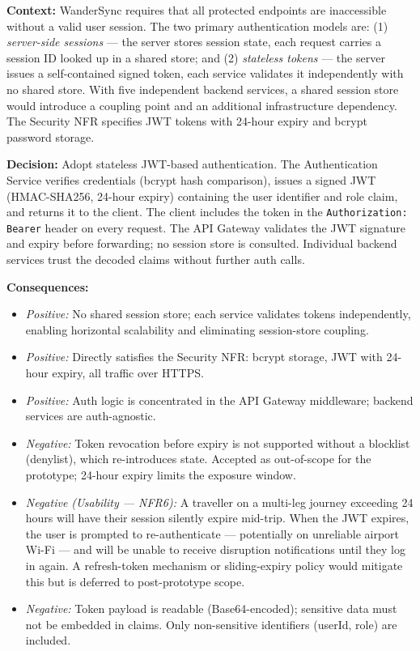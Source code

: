 \documentclass[12pt,a4paper]{article}
\newcommand{\adrfield}[2]{%
  \noindent\textbf{#1:}\hspace{0.5em}#2\par\vspace{0.3em}%
}
\begin{document}
\adrfield{Context}{
  WanderSync requires that all protected endpoints are inaccessible without a valid user session.
  The two primary authentication models are: (1) \textit{server-side sessions} — the server stores
  session state, each request carries a session ID looked up in a shared store; and (2)
  \textit{stateless tokens} — the server issues a self-contained signed token, each service
  validates it independently with no shared store. With five independent backend services, a
  shared session store would introduce a coupling point and an additional infrastructure dependency.
  The Security NFR specifies JWT tokens with 24-hour expiry and bcrypt password storage.
}

\adrfield{Decision}{
  Adopt stateless JWT-based authentication. The Authentication Service verifies credentials
  (bcrypt hash comparison), issues a signed JWT (HMAC-SHA256, 24-hour expiry) containing the
  user identifier and role claim, and returns it to the client. The client includes the token in
  the \texttt{Authorization: Bearer} header on every request. The API Gateway validates the JWT
  signature and expiry before forwarding; no session store is consulted. Individual backend
  services trust the decoded claims without further auth calls.
}

\adrfield{Consequences}{
  \begin{itemize}[noitemsep]
    \item \textit{Positive:} No shared session store; each service validates tokens independently,
          enabling horizontal scalability and eliminating session-store coupling.
    \item \textit{Positive:} Directly satisfies the Security NFR: bcrypt storage, JWT with
          24-hour expiry, all traffic over HTTPS.
    \item \textit{Positive:} Auth logic is concentrated in the API Gateway middleware; backend
          services are auth-agnostic.
    \item \textit{Negative:} Token revocation before expiry is not supported without a blocklist
          (denylist), which re-introduces state. Accepted as out-of-scope for the prototype;
          24-hour expiry limits the exposure window.
    \item \textit{Negative (Usability — NFR6):} A traveller on a multi-leg journey exceeding
          24 hours will have their session silently expire mid-trip. When the JWT expires, the
          user is prompted to re-authenticate — potentially on unreliable airport Wi-Fi — and will
          be unable to receive disruption notifications until they log in again. A refresh-token
          mechanism or sliding-expiry policy would mitigate this but is deferred to
          post-prototype scope.
    \item \textit{Negative:} Token payload is readable (Base64-encoded); sensitive data must not
          be embedded in claims. Only non-sensitive identifiers (userId, role) are included.
  \end{itemize}
}
\end{document}
